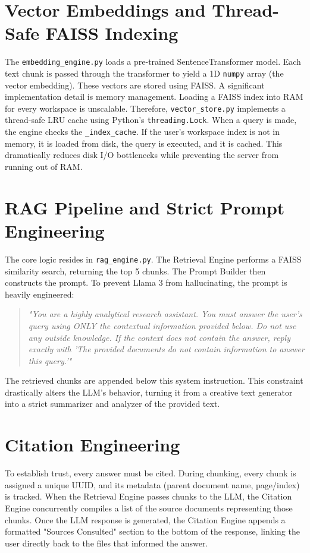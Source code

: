 \documentclass[12pt, a4paper]{report}
\begin{document}
\section{Vector Embeddings and Thread-Safe FAISS Indexing}
The \texttt{embedding\_engine.py} loads a pre-trained SentenceTransformer model. Each text chunk is passed through the transformer to yield a 1D \texttt{numpy} array (the vector embedding).
These vectors are stored using FAISS. A significant implementation detail is memory management. Loading a FAISS index into RAM for every workspace is unscalable. Therefore, \texttt{vector\_store.py} implements a thread-safe LRU cache using Python's \texttt{threading.Lock}. When a query is made, the engine checks the \texttt{\_index\_cache}. If the user's workspace index is not in memory, it is loaded from disk, the query is executed, and it is cached. This dramatically reduces disk I/O bottlenecks while preventing the server from running out of RAM.

\section{RAG Pipeline and Strict Prompt Engineering}
The core logic resides in \texttt{rag\_engine.py}. The Retrieval Engine performs a FAISS similarity search, returning the top 5 chunks. The Prompt Builder then constructs the prompt. To prevent Llama 3 from hallucinating, the prompt is heavily engineered:
\begin{quote}
    \textit{"You are a highly analytical research assistant. You must answer the user's query using ONLY the contextual information provided below. Do not use any outside knowledge. If the context does not contain the answer, reply exactly with 'The provided documents do not contain information to answer this query.'"}
\end{quote}
The retrieved chunks are appended below this system instruction. This constraint drastically alters the LLM's behavior, turning it from a creative text generator into a strict summarizer and analyzer of the provided text.

\section{Citation Engineering}
To establish trust, every answer must be cited. During chunking, every chunk is assigned a unique UUID, and its metadata (parent document name, page/index) is tracked. When the Retrieval Engine passes chunks to the LLM, the Citation Engine concurrently compiles a list of the source documents representing those chunks. Once the LLM response is generated, the Citation Engine appends a formatted "Sources Consulted" section to the bottom of the response, linking the user directly back to the files that informed the answer.
\end{document}

